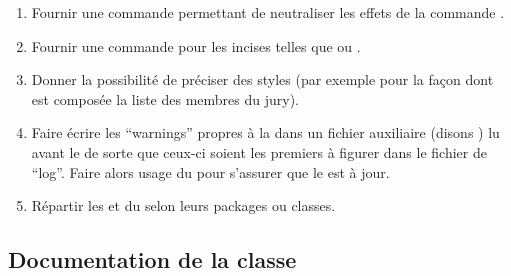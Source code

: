 \begin{enumerate}
  .
\item Fournir une commande  permettant de
  neutraliser les effets de la commande .
\item Fournir une commande  pour les incises telles que
   ou .
\item Donner la possibilité de préciser des styles (par exemple pour la façon
  dont est composée la liste des membres du jury).
\item Faire écrire les \foreignquote{english}{warnings} propres à la \yatcl{}
  dans un fichier auxiliaire (disons ) lu avant le  de sorte que ceux-ci
  soient les premiers à figurer dans le fichier de
  \foreignquote{english}{log}. Faire alors usage du 
  pour s'assurer que le  est à jour.
\item Répartir les  et  du
   selon leurs packages ou classes.
\end{enumerate}

\subsection{Documentation de la classe}
\label{sec:documentation-de-la-ult}

